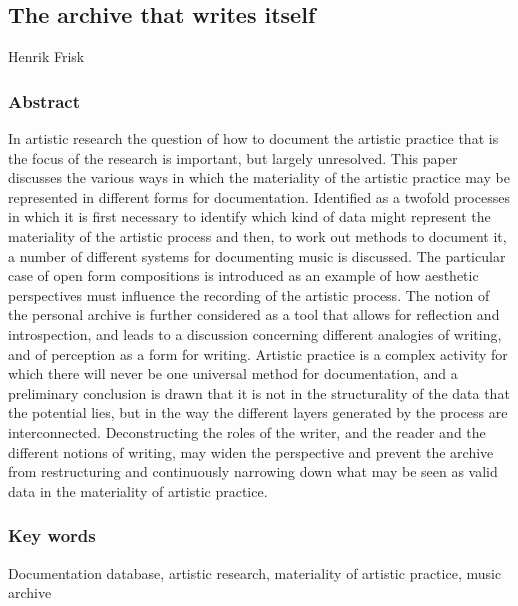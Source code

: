 \hypertarget{the-archive-that-writes-itself}{%
\subsection{The archive that writes
itself}\label{the-archive-that-writes-itself}}

Henrik Frisk

\hypertarget{abstract}{%
\subsubsection{Abstract}\label{abstract}}

In artistic research the question of how to document the artistic
practice that is the focus of the research is important, but largely
unresolved. This paper discusses the various ways in which the
materiality of the artistic practice may be represented in different
forms for documentation. Identified as a twofold processes in which it
is first necessary to identify which kind of data might represent the
materiality of the artistic process and then, to work out methods to
document it, a number of different systems for documenting music is
discussed. The particular case of open form compositions is introduced
as an example of how aesthetic perspectives must influence the recording
of the artistic process. The notion of the personal archive is further
considered as a tool that allows for reflection and introspection, and
leads to a discussion concerning different analogies of writing, and of
perception as a form for writing. Artistic practice is a complex
activity for which there will never be one universal method for
documentation, and a preliminary conclusion is drawn that it is not in
the structurality of the data that the potential lies, but in the way
the different layers generated by the process are interconnected.
Deconstructing the roles of the writer, and the reader and the different
notions of writing, may widen the perspective and prevent the archive
from restructuring and continuously narrowing down what may be seen as
valid data in the materiality of artistic practice.

\hypertarget{key-words}{%
\subsubsection{Key words}\label{key-words}}

Documentation database, artistic research, materiality of artistic
practice, music archive

